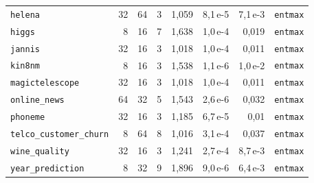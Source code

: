 \begin{table}[htbp]
\begin{tabular}{lrrrrrrr}
\texttt{helena} & 32 & 64 & 3 & 1{,}059 & 8{,}1\,e-5 & 7{,}1\,e-3 & \texttt{entmax} \\
\texttt{higgs} & 8 & 16 & 7 & 1{,}638 & 1{,}0\,e-4 & 0{,}019 & \texttt{entmax} \\
\texttt{jannis} & 32 & 16 & 3 & 1{,}018 & 1{,}0\,e-4 & 0{,}011 & \texttt{entmax} \\
\texttt{kin8nm} & 8 & 16 & 3 & 1{,}538 & 1{,}1\,e-6 & 1{,}0\,e-2 & \texttt{entmax} \\
\texttt{magictelescope} & 32 & 16 & 3 & 1{,}018 & 1{,}0\,e-4 & 0{,}011 & \texttt{entmax} \\
\texttt{online\_news} & 64 & 32 & 5 & 1{,}543 & 2{,}6\,e-6 & 0{,}032 & \texttt{entmax} \\
\texttt{phoneme} & 32 & 16 & 3 & 1{,}185 & 6{,}7\,e-5 & 0{,}01 & \texttt{entmax} \\
\texttt{telco\_\allowbreak customer\_\allowbreak churn} & 8 & 64 & 8 & 1{,}016 & 3{,}1\,e-4 & 0{,}037 & \texttt{entmax} \\
\texttt{wine\_quality} & 32 & 16 & 3 & 1{,}241 & 2{,}7\,e-4 & 8{,}7\,e-3 & \texttt{entmax} \\
\texttt{year\_\allowbreak prediction} & 8 & 32 & 9 & 1{,}896 & 9{,}0\,e-6 & 6{,}4\,e-3 & \texttt{entmax} \\
\bottomrule
\end{tabular}
\end{table}

